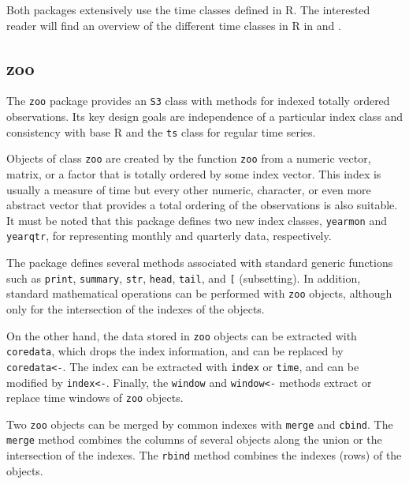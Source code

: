 Both packages extensively use the time classes defined in
\textsf{R}. The interested reader will find an overview of the
different time classes in \textsf{R} in \cite{Ripley.Hornik2001} and
\cite{Grothendieck.Petzoldt2004}.

\subsection{zoo}
\label{sec:zoo}


The \texttt{zoo} package \cite{Zeileis.Grothendieck2005} provides an
\texttt{S3} class with methods for indexed totally ordered
observations. Its key design goals are independence of a particular
index class and consistency with base \textsf{R} and the \texttt{ts}
class for regular time series.


Objects of class \texttt{zoo} are created by the function \texttt{zoo}
from a numeric vector, matrix, or a factor that is totally ordered by
some index vector. This index is usually a measure of time but every
other numeric, character, or even more abstract vector that provides a
total ordering of the observations is also suitable. It must be noted
that this package defines two new index classes, \texttt{yearmon} and
\texttt{yearqtr}, for representing monthly and quarterly data,
respectively.

The package defines several methods associated with standard generic
functions such as \texttt{print}, \texttt{summary}, \texttt{str},
\texttt{head}, \texttt{tail}, and \texttt{[} (subsetting). In
addition, standard mathematical operations can be performed with
\texttt{zoo} objects, although only for the intersection of the
indexes of the objects.

On the other hand, the data stored in \texttt{zoo} objects can be
extracted with \texttt{coredata}, which drops the index information,
and can be replaced by \texttt{coredata<-}. The index can be extracted
with \texttt{index} or \texttt{time}, and can be modified by
\texttt{index<-}. Finally, the \texttt{window} and \texttt{window<-}
methods extract or replace time windows of \texttt{zoo} objects.

Two \texttt{zoo} objects can be merged by common indexes with
\texttt{merge} and \texttt{cbind}. The \texttt{merge} method combines
the columns of several objects along the union or the intersection of
the indexes. The \texttt{rbind} method combines the indexes (rows) of
the objects.

